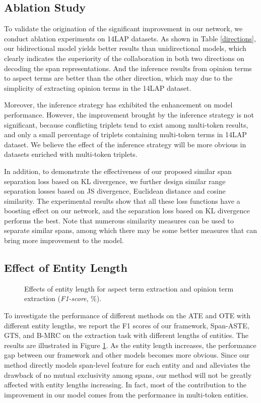 \documentclass[11pt]{article}
\begin{document}
\subsection{Ablation Study} \label{Ablation Study} 

To validate the origination of the significant improvement in our network, we conduct ablation experiments on 14LAP datasets. As shown in Table \ref{directions}, our bidirectional model yields better results than unidirectional models, which clearly indicates the superiority of the collaboration in both two directions on decoding the span representations. And the inference results from opinion terms to aspect terms are better than the other direction, which may due to the simplicity of extracting opinion terms in the 14LAP dataset. 

Moreover, the inference strategy has exhibited the enhancement on model performance. However, the improvement brought by the inference strategy is not significant, because conflicting triplets tend to exist among multi-token results, and only a small percentage of triplets containing multi-token terms in 14LAP dataset. We believe the effect of the inference strategy will be more obvious in datasets enriched with multi-token triplets.

In addition, to demonstrate the effectiveness of our proposed similar span separation loss based on KL divergence, we further design similar range separation losses based on JS divergence, Euclidean distance and cosine similarity. The experimental results show that all these loss functions have a boosting effect on our network, and the separation loss based on KL divergence performs the best. Note that numerous similarity measures can be used to separate similar spans, among which there may be some better measures that can bring more improvement to the model.
\subsection{Effect of Entity Length}
\begin{figure}[t]
	\centering
	\hfil
	\hfil
	\caption{Effects of entity length for aspect term extraction and opinion term extraction (\emph{F1-score}, \%).}
	\label{Target length}
\end{figure}

To investigate the performance of different methods on the ATE and OTE with different entity lengths, we report the F1 scores of our framework, Span-ASTE, GTS, and B-MRC on the extraction task with different lengths of entities. The results are illustrated in Figure \ref{Target length}. As the entity length increases, the performance gap between our framework and other models becomes more obvious. Since our method directly models span-level feature for each entity and and alleviates the drawback of no mutual exclusivity among spans, our method will not be greatly affected with entity lengths increasing. In fact, most of the contribution to the improvement in our model comes from the performance in multi-token entities.
\end{document}
